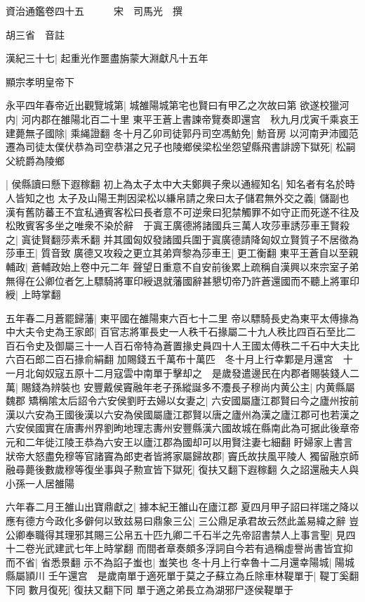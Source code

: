 資治通鑑卷四十五　　　宋　司馬光　撰

胡三省　音註

漢紀三十七|{
	起重光作噩盡旃蒙大淵獻凡十五年}


顯宗孝明皇帝下

永平四年春帝近出觀覽城第|{
	城雒陽城第宅也賢曰有甲乙之次故曰第}
欲遂校獵河内|{
	河内郡在雒陽北百二十里}
東平王蒼上書諫帝覽奏即還宫　秋九月戊寅千乘哀王建薨無子國除|{
	乘䋲證翻}
冬十月乙卯司徒郭丹司空馮魴免|{
	魴音房}
以河南尹沛國范遷為司徒太僕伏恭為司空恭湛之兄子也陵鄉侯梁松坐怨望縣飛書誹謗下獄死|{
	松嗣父統爵為陵鄉}


|{
	侯縣讀曰懸下遐稼翻}
初上為太子太中大夫鄭興子衆以通經知名|{
	知名者有名於時人皆知之也}
太子及山陽王荆因梁松以縑帛請之衆曰太子儲君無外交之義|{
	儲副也}
漢有舊防蕃王不宜私通賓客松曰長者意不可逆衆曰犯禁觸罪不如守正而死遂不往及松敗賓客多坐之唯衆不染於辭　于寘王廣德將諸國兵三萬人攻莎車誘莎車王賢殺之|{
	寘徒賢翻莎素禾翻}
并其國匈奴發諸國兵圍于寘廣德請降匈奴立賢質子不居徵為莎車王|{
	質音致}
廣德又攻殺之更立其弟齊黎為莎車王|{
	更工衡翻}
東平王蒼自以至親輔政|{
	蒼輔政始上卷中元二年}
聲望日重意不自安前後累上疏稱自漢興以來宗室子弟無得在公卿位者乞上驃騎將軍印綬退就藩國辭甚懇切帝乃許蒼還國而不聽上將軍印綬|{
	上時掌翻}


五年春二月蒼罷歸藩|{
	東平國在雒陽東六百七十二里}
帝以驃騎長史為東平太傅掾為中大夫令史為王家郎|{
	百官志將軍長史一人秩千石掾屬二十九人秩比四百石至比二百石令史及御屬三十一人百石帝特為蒼置掾史員四十人王國太傅秩二千石中大夫比六百石郎二百石掾俞絹翻}
加賜錢五千萬布十萬匹　冬十月上行幸鄴是月還宮　十一月北匈奴寇五原十二月寇雲中南單于擊却之　是歲發遣邊民在内郡者賜裝錢人二萬|{
	賜錢為辨裝也}
安豐戴侯竇融年老子孫縱誕多不灋長子穆尚内黄公主|{
	内黄縣屬魏郡}
矯稱隂太后詔令六安侯劉盱去婦以女妻之|{
	六安國屬廬江郡賢曰今之廬州按前漢以六安為王國後漢以六安為侯國屬廬江郡賢以唐之廬州為漢之廬江郡可也若漢之六安侯國實在唐夀州界劉昫地理志夀州安豐縣漢六國故城在縣南此為可据此後章帝元和二年徙江陵王恭為六安王以廬江郡為國却可以用賢注妻七細翻}
盱婦家上書言狀帝大怒盡免穆等官諸竇為郎吏者皆將家屬歸故郡|{
	竇氏故扶風平陵人}
獨留融京師融尋薨後數歲穆等復坐事與子勲宣皆下獄死|{
	復扶又翻下遐稼翻}
久之詔還融夫人與小孫一人居雒陽

六年春二月王雒山出寶鼎獻之|{
	據本紀王雒山在廬江郡}
夏四月甲子詔曰祥瑞之降以應有德方今政化多僻何以致兹易曰鼎象三公|{
	三公鼎足承君故云然此盖易緯之辭}
豈公卿奉職得其理邪其賜三公帛五十匹九卿二千石半之先帝詔書禁人上事言聖|{
	見四十二卷光武建武七年上時掌翻}
而間者章奏頗多浮詞自今若有過稱虛譽尚書皆宜抑而不省|{
	省悉景翻}
示不為諂子蚩也|{
	蚩笑也}
冬十月上行幸魯十二月還幸陽城|{
	陽城縣屬頴川}
壬午還宫　是歲南單于適死單于莫之子蘇立為丘除車林鞮單于|{
	鞮丁奚翻下同}
數月復死|{
	復扶又翻下同}
單于適之弟長立為湖邪尸逐侯鞮單于

